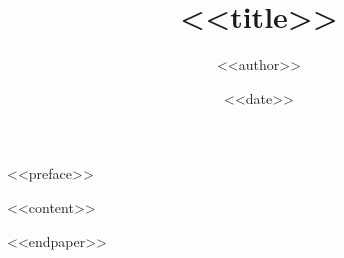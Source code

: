 \documentclass[12pt, b6paper, openany]{memoir}
\author{<<author>>}
\title{<<title>>}
\date{<<date>>}
\newenvironment{lastnote}{%
	\clearpage\vspace*{\fill}%
	\begin{small}
}{%
	\end{small}
}
\begin{document}
	\frontmatter
		\begin{titlingpage}
		\maketitle
		\end{titlingpage}
		\tableofcontents
<<preface>>

	\mainmatter
<<content>>
	\appendix
	\backmatter
\begin{lastnote}
<<endpaper>>
\end{lastnote}
\end{document}
